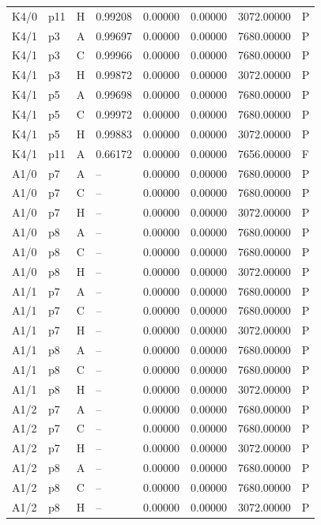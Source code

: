 \begin{longtable}{llllllll}
K4/0 & p11 & H & 0.99208 & 0.00000 & 0.00000 & 3072.00000 & P \\
K4/1 & p3 & A & 0.99697 & 0.00000 & 0.00000 & 7680.00000 & P \\
K4/1 & p3 & C & 0.99966 & 0.00000 & 0.00000 & 7680.00000 & P \\
K4/1 & p3 & H & 0.99872 & 0.00000 & 0.00000 & 3072.00000 & P \\
K4/1 & p5 & A & 0.99698 & 0.00000 & 0.00000 & 7680.00000 & P \\
K4/1 & p5 & C & 0.99972 & 0.00000 & 0.00000 & 7680.00000 & P \\
K4/1 & p5 & H & 0.99883 & 0.00000 & 0.00000 & 3072.00000 & P \\
K4/1 & p11 & A & 0.66172 & 0.00000 & 0.00000 & 7656.00000 & F \\
A1/0 & p7 & A & -- & 0.00000 & 0.00000 & 7680.00000 & P \\
A1/0 & p7 & C & -- & 0.00000 & 0.00000 & 7680.00000 & P \\
A1/0 & p7 & H & -- & 0.00000 & 0.00000 & 3072.00000 & P \\
A1/0 & p8 & A & -- & 0.00000 & 0.00000 & 7680.00000 & P \\
A1/0 & p8 & C & -- & 0.00000 & 0.00000 & 7680.00000 & P \\
A1/0 & p8 & H & -- & 0.00000 & 0.00000 & 3072.00000 & P \\
A1/1 & p7 & A & -- & 0.00000 & 0.00000 & 7680.00000 & P \\
A1/1 & p7 & C & -- & 0.00000 & 0.00000 & 7680.00000 & P \\
A1/1 & p7 & H & -- & 0.00000 & 0.00000 & 3072.00000 & P \\
A1/1 & p8 & A & -- & 0.00000 & 0.00000 & 7680.00000 & P \\
A1/1 & p8 & C & -- & 0.00000 & 0.00000 & 7680.00000 & P \\
A1/1 & p8 & H & -- & 0.00000 & 0.00000 & 3072.00000 & P \\
A1/2 & p7 & A & -- & 0.00000 & 0.00000 & 7680.00000 & P \\
A1/2 & p7 & C & -- & 0.00000 & 0.00000 & 7680.00000 & P \\
A1/2 & p7 & H & -- & 0.00000 & 0.00000 & 3072.00000 & P \\
A1/2 & p8 & A & -- & 0.00000 & 0.00000 & 7680.00000 & P \\
A1/2 & p8 & C & -- & 0.00000 & 0.00000 & 7680.00000 & P \\
A1/2 & p8 & H & -- & 0.00000 & 0.00000 & 3072.00000 & P \\

\end{longtable}
